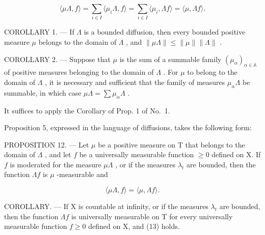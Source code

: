 \[
\langle \mu \Lambda , f \rangle = \sum_ {i \in I} \langle \mu_ {i} \Lambda , f \rangle = \sum_ {i \in I} \langle \mu_ {i}, \Lambda f \rangle = \langle \mu , \Lambda f \rangle .
\]

COROLLARY 1. --- If \(\Lambda\) is a bounded diffusion, then every bounded positive measure \(\mu\) belongs to the domain of \(\Lambda\) , and \(\|\mu\Lambda\| \leqslant \|\mu\|\|\Lambda\|\) .

COROLLARY 2. --- Suppose that \(\mu\) is the sum of a summable family \((\mu_{\alpha})_{\alpha \in \mathbb{A}}\) of positive measures belonging to the domain of \(\Lambda\) . For \(\mu\) to belong to the domain of \(\Lambda\) , it is necessary and sufficient that the family of measures \(\mu_{\alpha}\Lambda\) be summable, in which case \(\mu \Lambda = \sum \mu_{\alpha}\Lambda\) .

It suffices to apply the Corollary of Prop. 1 of No.~1.

Proposition 5, expressed in the language of diffusions, takes the following form:

PROPOSITION 12. --- Let \(\mu\) be a positive measure on T that belongs to the domain of \(\Lambda\) , and let \(f\) be a universally measurable function \(\geqslant 0\) defined on X. If \(f\) is moderated for the measure \(\mu\Lambda\) , or if the measures \(\lambda_t\) are bounded, then the function \(\Lambda f\) is \(\mu\) -measurable and

\[
\langle \mu \Lambda , f \rangle = \langle \mu , \Lambda f \rangle .\tag{13}
\]

COROLLARY. --- If X is countable at infinity, or if the measures \(\lambda_{t}\) are bounded, then the function \(\Lambda f\) is universally measurable on T for every universally measurable function \(f \geqslant 0\) defined on X, and (13) holds.

